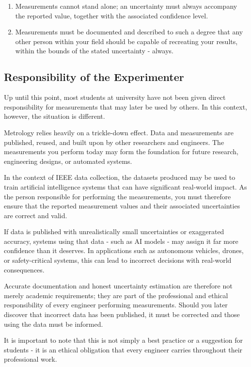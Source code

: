 \begin{enumerate}
    \item Measurements cannot stand alone; an uncertainty must always accompany the reported value, together with the associated confidence level.
    \item Measurements must be documented and described to such a degree that any other person within your field should be capable of recreating your results, within the bounds of the stated uncertainty - always.
\end{enumerate}

\subsection{Responsibility of the Experimenter}

Up until this point, most students at university have not been given direct responsibility for measurements that may later be used by others. In this context, however, the situation is different.

Metrology relies heavily on a trickle-down effect. Data and measurements are published, reused, and built upon by other researchers and engineers. The measurements you perform today may form the foundation for future research, engineering designs, or automated systems.

In the context of IEEE data collection, the datasets produced may be used to train artificial intelligence systems that can have significant real-world impact. As the person responsible for performing the measurements, you must therefore ensure that the reported measurement values and their associated uncertainties are correct and valid.

If data is published with unrealistically small uncertainties or exaggerated accuracy, systems using that data
- such as AI models - may assign it far more confidence than it deserves. In applications such as autonomous vehicles, drones, or safety-critical systems, this can lead to incorrect decisions with real-world consequences.

Accurate documentation and honest uncertainty estimation are therefore not merely academic requirements; they are part of the professional and ethical responsibility of every engineer performing measurements. Should you later discover that incorrect data has been published, it must be corrected and those using the data must be informed. 

It is important to note that this is not simply a best practice or a suggestion for students - it is an ethical obligation that every engineer carries throughout their professional work.